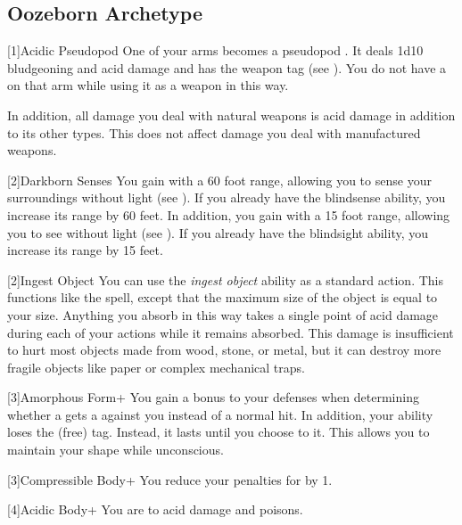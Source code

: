     \subsection{Oozeborn Archetype}

        [1]{Acidic Pseudopod} One of your arms becomes a pseudopod .
        It deals 1d10 bludgeoning and acid damage and has the  weapon tag (see ).
        You do not have a  on that arm while using it as a weapon in this way.

        In addition, all damage you deal with natural weapons is acid damage in addition to its other types.
        This does not affect damage you deal with manufactured weapons.

        [2]{Darkborn Senses} You gain  with a 60 foot range, allowing you to sense your surroundings without light (see ).
        If you already have the blindsense ability, you increase its range by 60 feet.
        In addition, you gain  with a 15 foot range, allowing you to see without light (see ).
        If you already have the blindsight ability, you increase its range by 15 feet.

        [2]{Ingest Object} You can use the \textit{ingest object} ability as a standard action.
        This functions like the  spell, except that the maximum size of the object is equal to your size.
        Anything you absorb in this way takes a single point of  acid damage during each of your actions while it remains absorbed.
        This damage is insufficient to hurt most objects made from wood, stone, or metal, but it can destroy more fragile objects like paper or complex mechanical traps.

        [3]{Amorphous Form+} You gain a  bonus to your defenses when determining whether a  gets a  against you instead of a normal hit.
        In addition, your  ability loses the  (free) tag.
        Instead, it lasts until you choose to  it.
        This allows you to maintain your shape while unconscious.

        [3]{Compressible Body+} You reduce your penalties for \squeezing by 1.

        [4]{Acidic Body+} You are  to acid damage and poisons.

